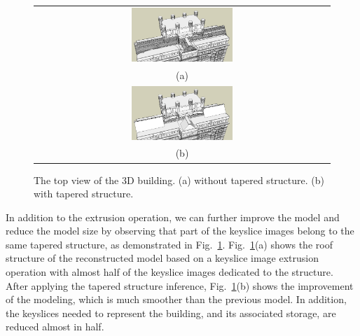 \documentclass{acmsiggraph}                     %
\newcommand{\Fig}[1]{Fig.~\ref{fig:#1}}
\newcommand{\Figa}[1]{Fig.~\ref{fig:#1}(a)}
\newcommand{\Figb}[1]{Fig.~\ref{fig:#1}(b)}
\begin{document}
\begin{figure}[htbp]
\begin{center}
\begin{tabular}{c}
\includegraphics[width=0.35\textwidth]{extrude_1.png} \\
(a) \\
\includegraphics[width=0.35\textwidth]{extrude_2.png} \\
(b)
\end{tabular}
\end{center}
\caption{The top view of the 3D building. (a) without tapered structure. (b) with tapered structure.}
\label{fig:DXF_top}
\end{figure}

In addition to the extrusion operation, we can further improve the model
and reduce the model size by observing that part of the keyslice images
belong to the same tapered structure, as demonstrated in \Fig{DXF_top}.
\Figa{DXF_top} shows the roof structure
of the reconstructed model based on a keyslice image extrusion operation with
almost half of the keyslice images dedicated to the structure.
After applying the tapered structure inference, \Figb{DXF_top}
shows the improvement of the modeling, which is much smoother than the
previous model.
In addition, the keyslices needed to represent the building, and its
associated storage, are reduced almost in half.
\end{document}
